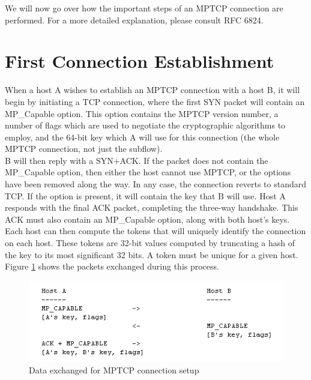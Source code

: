 We will now go over how the important steps of an MPTCP connection are performed. For a more detailed explanation, please consult RFC 6824.\\ 



\section{First Connection Establishment}
When a host A wishes to establish an MPTCP connection with a host B, it will begin by initiating a TCP connection, where the first SYN packet will contain an MP\_Capable option. This option contains the MPTCP version number, a number of flags which are used to negotiate the cryptographic algorithms to employ, and the 64-bit key which A will use for this connection (the whole MPTCP connection, not just the subflow). \\

B will then reply with a SYN+ACK. If the packet does not contain the MP\_Capable option, then either the host cannot use MPTCP, or the options have been removed along the way. In any case, the connection reverts to standard TCP. If the option is present, it will contain the key that B will use. Host A responds with the final ACK packet, completing the three-way handshake. This ACK must also contain an MP\_Capable option, along with both host's keys. \\

Each host can then compute the tokens that will uniquely identify the connection on each host. These tokens are 32-bit values computed by truncating a hash of the key to its most significant 32 bits. A token must be unique for a given host. Figure  \ref{pic:mpcapex} shows the packets exchanged during this process.

\begin{figure}[!t]
\centering
\includegraphics[scale= 0.6]{Figures/mpcapex.png}
\caption{Data exchanged for MPTCP connection setup}
\label{pic:mpcapex}
\end{figure}

